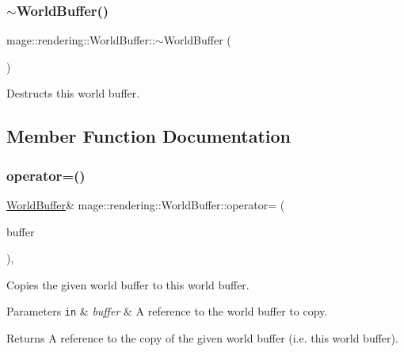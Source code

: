 \subsubsection{\texorpdfstring{$\sim$\+World\+Buffer()}{~WorldBuffer()}}
{\footnotesize\ttfamily mage\+::rendering\+::\+World\+Buffer\+::$\sim$\+World\+Buffer (\begin{DoxyParamCaption}{ }\end{DoxyParamCaption})\hspace{0.3cm}{\ttfamily [default]}}

Destructs this world buffer. 

\subsection{Member Function Documentation}
\mbox{\label{structmage_1_1rendering_1_1_world_buffer_a0a776f3c84577f8530cf5932274cd8c9}} 
\subsubsection{\texorpdfstring{operator=()}{operator=()}\hspace{0.1cm}{\footnotesize\ttfamily [1/2]}}
{\footnotesize\ttfamily \mbox{\hyperlink{structmage_1_1rendering_1_1_world_buffer}{World\+Buffer}}\& mage\+::rendering\+::\+World\+Buffer\+::operator= (\begin{DoxyParamCaption}\item[{const \mbox{\hyperlink{structmage_1_1rendering_1_1_world_buffer}{World\+Buffer}} \&}]{buffer }\end{DoxyParamCaption})\hspace{0.3cm}{\ttfamily [default]}, {\ttfamily [noexcept]}}

Copies the given world buffer to this world buffer.


\begin{DoxyParams}[1]{Parameters}
\mbox{\tt in}  & {\em buffer} & A reference to the world buffer to copy. \\
\hline
\end{DoxyParams}
\begin{DoxyReturn}{Returns}
A reference to the copy of the given world buffer (i.\+e. this world buffer). 
\end{DoxyReturn}
\mbox{\label{structmage_1_1rendering_1_1_world_buffer_a3fcc219d1410d858cc3b15f1cac5da9a}} 
